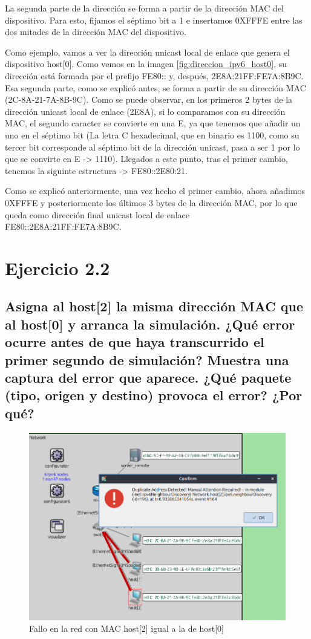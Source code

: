 La segunda parte de la dirección se forma a partir de la dirección MAC del dispositivo. Para esto, fijamos el séptimo bit a 1 e insertamos 0XFFFE entre las dos mitades de la dirección MAC del dispositivo. 

Como ejemplo, vamos a ver la dirección unicast local de enlace que genera el dispositivo host[0]. Como vemos en la imagen \ref{fig:direccion_ipv6_host0}, su dirección está formada por el prefijo FE80:: y, después, 2E8A:21FF:FE7A:8B9C. Esa segunda parte, como se explicó antes, se forma a partir de su dirección MAC (2C-8A-21-7A-8B-9C). Como se puede observar, en los primeros 2 bytes de la dirección unicast local de enlace (2E8A), si lo comparamos con su dirección MAC, el segundo caracter se convierte en una E, ya que tenemos que añadir un uno en el séptimo bit (La letra C hexadecimal, que en binario es 1100, como su tercer bit corresponde al séptimo bit de la dirección unicast, pasa a ser 1 por lo que se convirte en E -> 1110). Llegados a este punto, tras el primer cambio, tenemos la siguinte estructura -> FE80::2E80:21.

Como se explicó anteriormente, una vez hecho el primer cambio, ahora añadimos 0XFFFE  y posteriormente los últimos 3 bytes de la dirección MAC, por lo que queda como dirección final unicast local de enlace\\ FE80::2E8A:21FF:FE7A:8B9C.


\section{Ejercicio 2.2}\label{chap:ejer22}
\subsection{Asigna al host[2] la misma dirección MAC que al host[0] y arranca la simulación. ¿Qué error ocurre antes de
que haya transcurrido el primer segundo de simulación? Muestra una captura del error que aparece. ¿Qué
paquete (tipo, origen y destino) provoca el error? ¿Por qué?}

\begin{figure}[!ht]
    \centering
    \includegraphics[width=135mm, scale=0.75]{imaxes/captura_ejer2_2.png}
    \caption{Fallo en la red con MAC host[2] igual a la de host[0]}
    \label{fig:fallo_ipv6_host2}
\end{figure}

